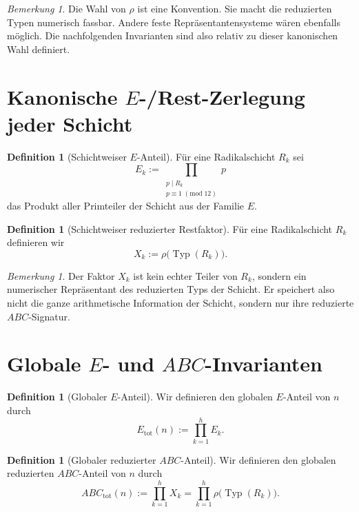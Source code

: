 \documentclass[11pt,a4paper]{article}
\theoremstyle{definition}
\newtheorem{definition}[satz]{Definition}
\theoremstyle{remark}
\newtheorem{bemerkung}[satz]{Bemerkung}
\newcommand{\Typ}{\operatorname{Typ}}
\begin{document}
	\begin{bemerkung}
		Die Wahl von \(\rho\) ist eine Konvention. Sie macht die reduzierten Typen numerisch fassbar.
		Andere feste Repräsentantensysteme wären ebenfalls möglich. Die nachfolgenden Invarianten sind
		also relativ zu dieser kanonischen Wahl definiert.
	\end{bemerkung}
	
	\section{Kanonische \(E\)-/Rest-Zerlegung jeder Schicht}
	
	\begin{definition}[Schichtweiser \(E\)-Anteil]
		Für eine Radikalschicht \(R_k\) sei
		\[
		E_k:=\prod_{\substack{p\mid R_k\\ p\equiv 1\;(\mathrm{mod}\;12)}} p
		\]
		das Produkt aller Primteiler der Schicht aus der Familie \(E\).
	\end{definition}
	
	\begin{definition}[Schichtweiser reduzierter Restfaktor]
		Für eine Radikalschicht \(R_k\) definieren wir
		\[
		X_k:=\rho\bigl(\Typ(R_k)\bigr).
		\]
	\end{definition}
	
	\begin{bemerkung}
		Der Faktor \(X_k\) ist kein echter Teiler von \(R_k\), sondern ein numerischer Repräsentant
		des reduzierten Typs der Schicht. Er speichert also nicht die ganze arithmetische Information
		der Schicht, sondern nur ihre reduzierte \(ABC\)-Signatur.
	\end{bemerkung}
	
	\section{Globale \(E\)- und \(ABC\)-Invarianten}
	
	\begin{definition}[Globaler \(E\)-Anteil]
		Wir definieren den globalen \(E\)-Anteil von \(n\) durch
		\[
		E_{\mathrm{tot}}(n):=\prod_{k=1}^h E_k.
		\]
	\end{definition}
	
	\begin{definition}[Globaler reduzierter \(ABC\)-Anteil]
		Wir definieren den globalen reduzierten \(ABC\)-Anteil von \(n\) durch
		\[
		ABC_{\mathrm{tot}}(n):=\prod_{k=1}^h X_k
		=\prod_{k=1}^h \rho\bigl(\Typ(R_k)\bigr).
		\]
	\end{definition}
	
\end{document}

